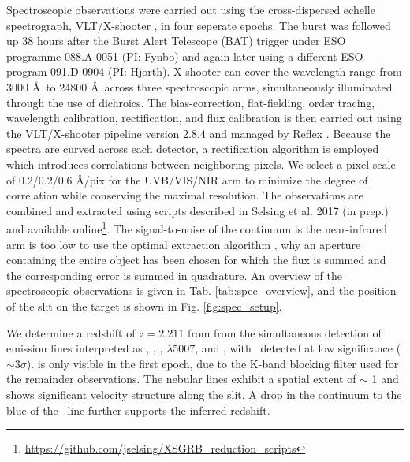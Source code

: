 \documentclass{aa}    %
\begin{document}
Spectroscopic observations were carried out using the cross-dispersed echelle spectrograph, VLT/X-shooter \citep{Vernet2011}, in four seperate epochs. The burst was followed up 38 hours after the Burst Alert Telescope (BAT) trigger under ESO programme 088.A-0051 (PI: Fynbo) and again later using a different ESO program 091.D-0904 (PI: Hjorth). X-shooter can cover the wavelength range from 3000 \AA~to 24800 \AA~across three spectroscopic arms, simultaneously illuminated through the use of dichroics. The bias-correction, flat-fielding, order tracing, wavelength calibration, rectification, and flux calibration is then carried out using the VLT/X-shooter pipeline version 2.8.4 \citep{Goldoni2006, Modigliani2010} and managed by Reflex \citep{Freudling2013}. Because the spectra are curved across each detector, a rectification algorithm is employed which introduces correlations between neighboring pixels. We select a pixel-scale of 0.2/0.2/0.6 \AA/pix for the UVB/VIS/NIR arm to minimize the degree of correlation while conserving the maximal resolution. The observations are combined and extracted using scripts described in Selsing et al. 2017 (in prep.) and available online\footnote{\url{https://github.com/jselsing/XSGRB_reduction_scripts}}. The signal-to-noise of the continuum is the near-infrared arm is too low to use the optimal extraction algorithm \citep{Horne1986}, why an aperture containing the entire object has been chosen for which the flux is summed and the corresponding error is summed in quadrature.
An overview of the spectroscopic observations is given in Tab. \ref{tab:spec_overview}, and the position of the slit on the target is shown in Fig. \ref{fig:spec_setup}.


We determine a redshift of $z = 2.211$ from from the simultaneous detection of emission lines interpreted as \lya, \oii, \hb, \oiii$\lambda$5007, and \ha, with \hb~detected at low significance ($\sim 3 \sigma$). \ha is only visible in the first epoch, due to the K-band blocking filter used for the remainder observations. The nebular lines exhibit a spatial extent of $\sim$ 1 and shows significant velocity structure along the slit. A drop in the continuum to the blue of the \lya~line further supports the inferred redshift.
\end{document}
